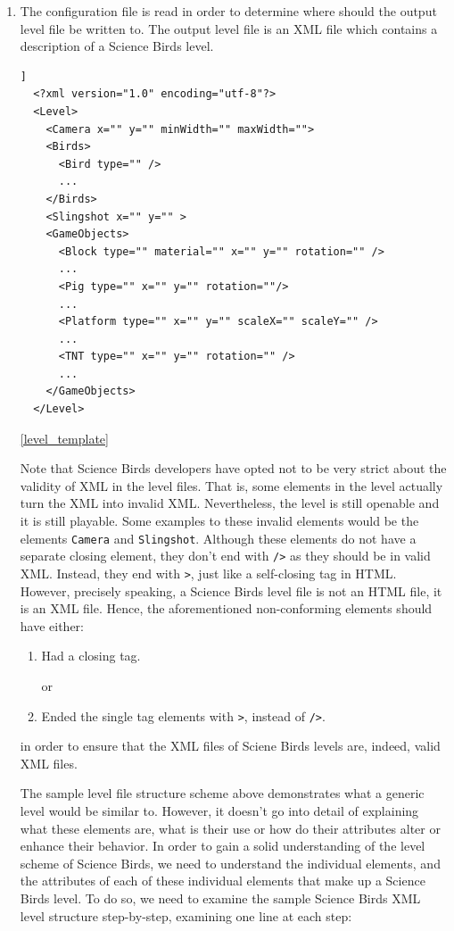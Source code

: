 \documentclass{dalthesis}
\begin{document}
\begin{enumerate}
  \item The configuration file is read in order to determine where should the output level file be written to. The output level file is an XML file which contains a description of a Science Birds level.

  \begin{lstlisting}[float,caption=A Science Birds level template,label=level_template]]
  <?xml version="1.0" encoding="utf-8"?>
  <Level>
    <Camera x="" y="" minWidth="" maxWidth="">
    <Birds>
      <Bird type="" />
      ...
    </Birds>
    <Slingshot x="" y="" >
    <GameObjects>
      <Block type="" material="" x="" y="" rotation="" />
      ...
      <Pig type="" x="" y="" rotation=""/>
      ...
      <Platform type="" x="" y="" scaleX="" scaleY="" />
      ...
      <TNT type="" x="" y="" rotation="" />
      ...
    </GameObjects>
  </Level>
  \end{lstlisting}

  \ref{level_template}

  Note that Science Birds developers have opted not to be very strict about the validity of XML in the level files. That is, some elements in the level actually turn the XML into invalid XML. Nevertheless, the level is still openable and it is still playable. Some examples to these invalid elements would be the elements \lstinline{Camera} and \lstinline{Slingshot}. Although these elements do not have a separate closing element, they don't end with \lstinline{/>} as they should be in valid XML. Instead, they end with \lstinline{>}, just like a self-closing tag in HTML. However, precisely speaking, a Science Birds level file is not an HTML file, it is an XML file. Hence, the aforementioned non-conforming elements should have either:

  \begin{enumerate}
    \item Had a closing tag.

    or

    \item Ended the single tag elements with \lstinline{>}, instead of \lstinline{/>}.
  \end{enumerate}

  in order to ensure that the XML files of Sciene Birds levels are, indeed, valid XML files.

  The sample level file structure scheme above demonstrates what a generic level would be similar to. However, it doesn't go into detail of explaining what these elements are, what is their use or how do their attributes alter or enhance their behavior. In order to gain a solid understanding of the level scheme of Science Birds, we need to understand the individual elements, and the attributes of each of these individual elements that make up a Science Birds level. To do so, we need to examine the sample Science Birds XML level structure step-by-step, examining one line at each step:


\end{enumerate}
\end{document}
